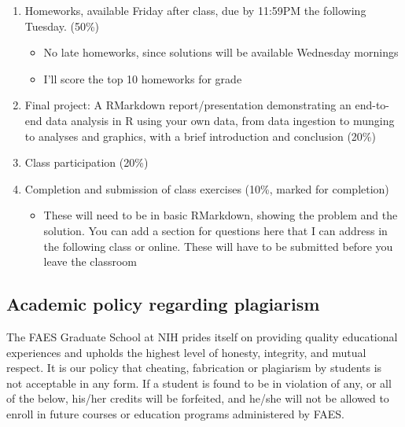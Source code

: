 \documentclass[
]{article}
\providecommand{\tightlist}{%
  \setlength{\itemsep}{0pt}\setlength{\parskip}{0pt}}
\begin{document}
\begin{enumerate}
\def\labelenumi{\arabic{enumi}.}
\tightlist
\item
  Homeworks, available Friday after class, due by 11:59PM the following
  Tuesday. (50\%)

  \begin{itemize}
  \tightlist
  \item
    No late homeworks, since solutions will be available Wednesday
    mornings
  \item
    I'll score the top 10 homeworks for grade
  \end{itemize}
\item
  Final project: A RMarkdown report/presentation demonstrating an
  end-to-end data analysis in R using your own data, from data ingestion
  to munging to analyses and graphics, with a brief introduction and
  conclusion (20\%)
\item
  Class participation (20\%)
\item
  Completion and submission of class exercises (10\%, marked for
  completion)

  \begin{itemize}
  \tightlist
  \item
    These will need to be in basic RMarkdown, showing the problem and
    the solution. You can add a section for questions here that I can
    address in the following class or online. These will have to be
    submitted before you leave the classroom
  \end{itemize}
\end{enumerate}

\hypertarget{academic-policy-regarding-plagiarism}{%
\subsection{Academic policy regarding
plagiarism}\label{academic-policy-regarding-plagiarism}}

The FAES Graduate School at NIH prides itself on providing quality
educational experiences and upholds the highest level of honesty,
integrity, and mutual respect. It is our policy that cheating,
fabrication or plagiarism by students is\\
not acceptable in any form. If a student is found to be in violation of
any, or all of the below, his/her credits will be forfeited, and he/she
will not be allowed to enroll in future courses or education programs
administered by FAES.
\end{document}
